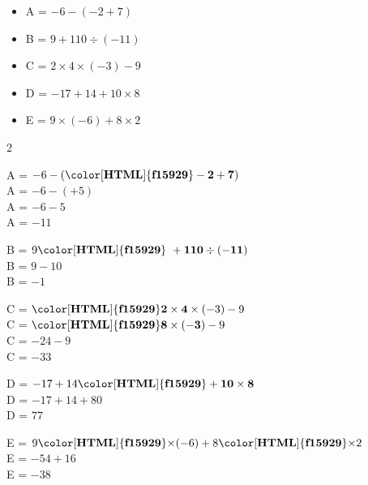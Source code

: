 \begin{exercice*}    
        \begin{itemize}
            \item[] A = $-6-(-2+7)$
            \item[] B = $9+110\div(-11)$
            \item[] C = $2\times4\times(-3)-9$
            \item[] D = $-17+14+10\times8$
            \item[] E = $9\times(-6)+8\times2$
        \end{itemize}
\end{exercice*}
\begin{corrige}
    \phantom{rrr}
    \begin{multicols}2
        \begin{list}{}{}
            \item A = $-6-(\mathbf{{\color[HTML]{f15929}-2+7}})$ \\
            A = $-6-(+5)$ \\
            A = $-6-5$ \\
            A = $-11$ 
            \item B = $9\mathbf{{\color[HTML]{f15929}~+110\div(-11)}}$ \\
            B = $9-10$ \\
            B = $-1$ 
            \item C = $\mathbf{{\color[HTML]{f15929}2\times4}}\times(-3)-9$ \\
            C = $\mathbf{{\color[HTML]{f15929}8\times(-3)}}-9$ \\
            C = $-24-9$ \\
            C = $-33$ 
            \item D = $-17+14\mathbf{{\color[HTML]{f15929}+10\times8}}$ \\
            D = $-17+14+80$ \\
            D = $77$ 
            \item E = $9\mathbf{{\color[HTML]{f15929}\times}}(-6)+8\mathbf{{\color[HTML]{f15929}\times}}2$ \\
            E = $-54+16$ \\
            E = $-38$ 
        \end{list}
    \end{multicols}
\end{corrige}
